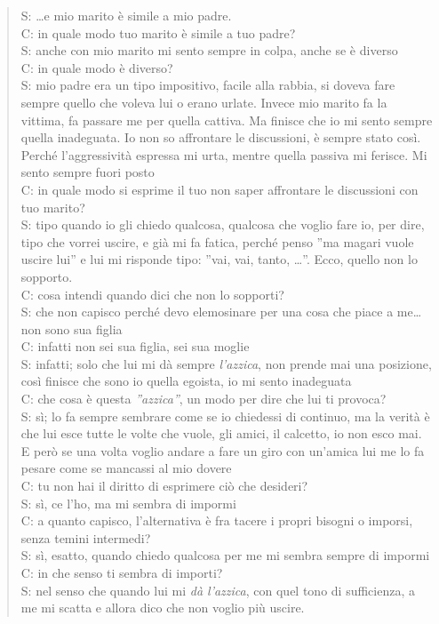 \begin{verse}
S: \dots e mio marito è simile a mio padre.\\
C: in quale modo tuo marito è simile a tuo padre?\\
S: anche con mio marito mi sento sempre in colpa, anche se è diverso\\
C: in quale modo è diverso?\\
S: mio padre era un tipo impositivo, facile alla rabbia, si doveva fare sempre quello che voleva lui o erano urlate. Invece mio marito fa la vittima, fa passare me per quella cattiva. Ma finisce che io mi sento sempre quella inadeguata. Io non so affrontare le discussioni, è sempre stato così. Perché l'aggressività espressa mi urta, mentre quella passiva mi ferisce. Mi sento sempre fuori posto\\
C: in quale modo si esprime il tuo non saper affrontare le discussioni con tuo marito?\\
S: tipo quando io gli chiedo qualcosa, qualcosa che voglio fare io, per dire, tipo che vorrei uscire, e già mi fa fatica, perché penso ''ma magari vuole uscire lui'' e lui mi risponde tipo: ''vai, vai, tanto, \dots''. Ecco, quello non lo sopporto.\\
C: cosa intendi quando dici che non lo sopporti?\\
S: che non capisco perché devo elemosinare per una cosa che piace a me\dots non sono sua figlia\\
C: infatti non sei sua figlia, sei sua moglie\\
S: infatti; solo che lui mi dà sempre\emph{ l'azzica}, non prende mai una posizione, così finisce che sono io quella egoista, io mi sento inadeguata\\
C: che cosa è questa \emph{''azzica''}, un modo per  dire che lui ti provoca?\\
S: sì; lo fa sempre sembrare come se io chiedessi di continuo, ma la verità è che lui esce tutte le volte che vuole, gli amici, il calcetto, io non esco mai. E però se una volta voglio andare a fare un giro con un'amica lui me lo fa pesare come se mancassi al mio dovere\\
C: tu non hai il diritto di esprimere ciò che desideri?\\
S: sì, ce l'ho, ma mi sembra di impormi\\
C: a quanto capisco, l'alternativa è fra tacere i propri bisogni o imporsi, senza temini intermedi?\\
S: sì, esatto, quando chiedo qualcosa per me mi sembra sempre di impormi\\
C: in che senso ti sembra di importi?\\
S: nel senso che quando lui mi \emph{dà l'azzica}, con quel tono di sufficienza, a me mi scatta e allora dico che non voglio più uscire.
\end{verse}

